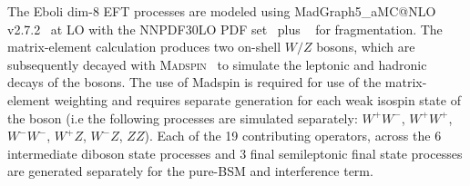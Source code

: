 The Eboli dim-8 EFT processes are modeled using MadGraph5\_aMC@NLO v2.7.2~\cite{Alwall:2014hca} at LO with the  \textsc{NNPDF30LO} PDF set~\cite{Ball:2012cx} plus ~\cite{Sjostrand:2007gs} for fragmentation.
The matrix-element calculation produces two on-shell $W/Z$ bosons, which are subsequently decayed with \textsc{Madspin}~\cite{Artoisenet:2012st} to simulate the leptonic and hadronic decays of the bosons.
The use of Madspin is required for use of the matrix-element weighting and requires separate generation for each weak isospin state of the boson (i.e the following processes are simulated separately: $W^+W^-$, $W^+W^+$, $W^-W^-$, $W^+Z$, $W^-Z$, $ZZ$).
Each of the 19 contributing operators, across the 6 intermediate diboson state processes and 3 final semileptonic final state processes are generated separately for the pure-BSM and interference term.



